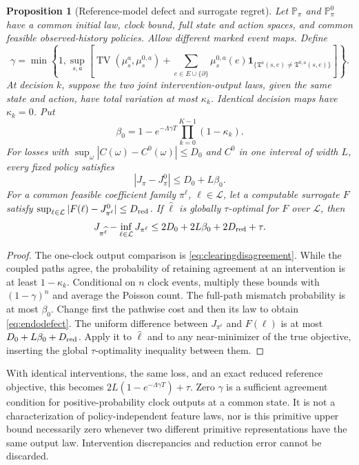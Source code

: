 \documentclass[11pt]{article}
\numberwithin{equation}{section}
\newtheorem{proposition}[theorem]{Proposition}
\theoremstyle{definition}
\theoremstyle{remark}
\theoremstyle{definition}
\newcommand{\TV}{\operatorname{TV}}
\begin{document}
\begin{proposition}[Reference-model defect and surrogate regret]
\label{prop:endodefect}
Let $\mathbb P_\pi$ and $\mathbb P^0_\pi$ have a common initial law,
clock bound, full state and action spaces, and common feasible
observed-history policies. Allow different marked event maps. Define
\begin{equation}\label{eq:feedbackgain}
 \gamma=\min\!\left\{1,\sup_{s,a}\left[
  \TV(\mu_s^a,\mu_s^{0,a})+
  \sum_{e\in E\cup\{\partial\}}\mu_s^{0,a}(e)
   \mathbf1_{\{\mathfrak T^a(s,e)\ne\mathfrak T^{0,a}(s,e)\}}
                         \right]\right\}.
\end{equation}
At decision $k$, suppose the two joint intervention-output laws, given
the same state and action, have total variation at most $\kappa_k$.
Identical decision maps have $\kappa_k=0$. Put
\[
 \beta_0=1-e^{-\Lambda\gamma T}\prod_{k=0}^{K-1}(1-\kappa_k).
\]
For losses with $\sup_\omega|C(\omega)-C^0(\omega)|\le D_0$ and
$C^0$ in one interval of width $L$, every fixed policy satisfies
\begin{equation}\label{eq:endodefect}
 |J_\pi-J^0_\pi|\le D_0+L\beta_0.
\end{equation}
For a common feasible coefficient family $\pi^\ell$, $\ell\in\mathcal L$,
let a computable surrogate $F$ satisfy
$\sup_{\ell\in\mathcal L}|F(\ell)-J^0_{\pi^\ell}|\le D_{\rm red}$.
If $\widehat\ell$ is globally $\tau$-optimal for $F$ over $\mathcal L$, then
\begin{equation}\label{eq:endocertificate}
 J_{\pi^{\widehat\ell}}-\inf_{\ell\in\mathcal L}J_{\pi^\ell}
 \le 2D_0+2L\beta_0+2D_{\rm red}+\tau.
\end{equation}
\end{proposition}
\begin{proof}
The one-clock output comparison is \eqref{eq:clearingdisagreement}.
While the coupled paths agree, the probability of retaining agreement at
an intervention is at least $1-\kappa_k$. Conditional on $n$ clock events,
multiply these bounds with $(1-\gamma)^n$ and average the Poisson count.
The full-path mismatch probability is at most $\beta_0$.
Change first the pathwise cost and then its law to obtain
\eqref{eq:endodefect}. The uniform difference between $J_{\pi^\ell}$ and
$F(\ell)$ is at most $D_0+L\beta_0+D_{\rm red}$.
Apply it to $\widehat\ell$ and to any near-minimizer of the true objective,
inserting the global $\tau$-optimality inequality between them.
\end{proof}

With identical interventions, the same loss, and an exact reduced reference
objective, this becomes $2L(1-e^{-\Lambda\gamma T})+\tau$.
Zero $\gamma$ is a sufficient agreement condition for positive-probability
clock outputs at a common state. It is not a characterization of
policy-independent feature laws, nor is this primitive upper bound
necessarily zero whenever two different primitive representations have the
same output law. Intervention discrepancies and reduction error cannot be
discarded.
\end{document}
